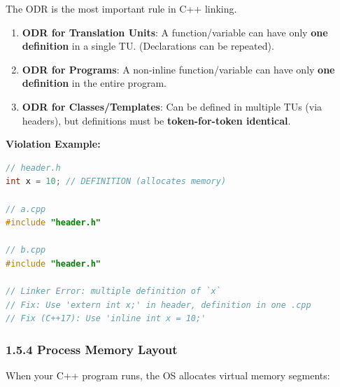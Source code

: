 The ODR is the most important rule in C++ linking.

\begin{enumerate}
\def\labelenumi{\arabic{enumi}.}
\tightlist
\item
  \textbf{ODR for Translation Units}: A function/variable can have only
  \textbf{one definition} in a single TU. (Declarations can be
  repeated).
\item
  \textbf{ODR for Programs}: A non-inline function/variable can have
  only \textbf{one definition} in the entire program.
\item
  \textbf{ODR for Classes/Templates}: Can be defined in multiple TUs
  (via headers), but definitions must be \textbf{token-for-token
  identical}.
\end{enumerate}

\textbf{Violation Example:}

\begin{lstlisting}[language={C++}]
// header.h
int x = 10; // DEFINITION (allocates memory)

// a.cpp
#include "header.h"

// b.cpp
#include "header.h"

// Linker Error: multiple definition of `x`
// Fix: Use 'extern int x;' in header, definition in one .cpp
// Fix (C++17): Use 'inline int x = 10;'
\end{lstlisting}

\hypertarget{process-memory-layout}{%
\subsubsection{1.5.4 Process Memory
Layout}\label{process-memory-layout}}

When your C++ program runs, the OS allocates virtual memory segments:

